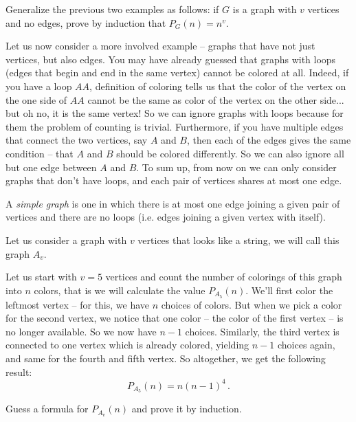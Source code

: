 \begin{exercise}
Generalize the previous two examples as follows: if $G$ is a graph with $v$ vertices and no edges, prove by induction that $P_G(n) = n^v$.
\end{exercise}

Let us now consider a more involved example -- graphs that have not just vertices, but also edges. You may have already guessed that graphs with loops (edges that begin and end in the same vertex) cannot be colored at all. Indeed, if you have a loop $AA$, definition of coloring tells us that the color of the vertex on the one side of $AA$ cannot be the same as color of the vertex on the other side... but oh no, it is the same vertex! So we can ignore graphs with loops because for them the problem of counting is trivial. Furthermore, if you have multiple edges that connect the two vertices, say $A$ and $B$, then each of the edges gives the same condition -- that $A$ and $B$ should be colored differently. So we can also ignore all but one edge between $A$ and $B$. To sum up, from now on we can only consider graphs that don't have loops, and each pair of vertices shares at most one edge.

\begin{definition}
    A \emph{simple graph} is one in which there is at most one edge joining a given 
    pair of vertices and there are no loops (i.e. edges joining a given vertex with itself).
\end{definition}


\begin{example}
Let us consider a graph with $v$ vertices that looks like a string, we will call this graph $A_v$.

Let us start with $v=5$ vertices and count the number of colorings of this graph into $n$ colors, that is we will calculate the value $P_{A_5}(n)$. We'll first color the leftmost vertex -- for this, we have $n$ choices of colors. But when we pick a color for the second vertex, we notice that one color -- the color of the first vertex -- is no longer available. So we now have $n-1$ choices. Similarly, the third vertex is connected to one vertex which is already colored, yielding $n-1$ choices again, and same for the fourth and fifth vertex. So altogether, we get the following result:
$$ P_{A_5}(n) = n(n-1)^4 \,.$$
\end{example}

\begin{exercise}
Guess a formula for $P_{A_v}(n)$ and prove it by induction.
\end{exercise}


